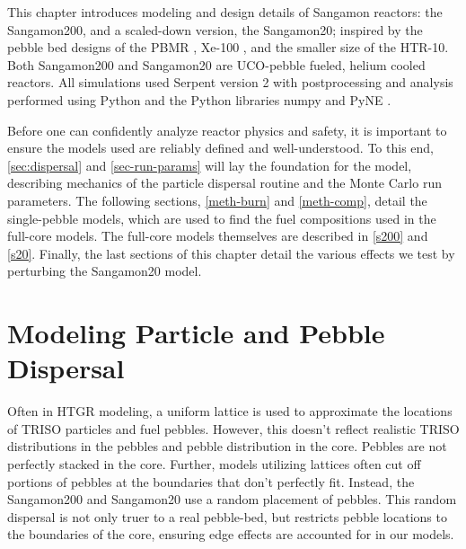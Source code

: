 This chapter introduces modeling and design details of Sangamon reactors:  the Sangamon200, and a scaled-down version, the Sangamon20; inspired by the pebble bed designs of the PBMR \cite{venter_pbmr_2005}, Xe-100 \cite{harlan_ans_2017, harlan_x-energy_2018}, and the smaller size of the HTR-10.  Both Sangamon200 and Sangamon20 are UCO-pebble fueled, helium cooled reactors.  All simulations used Serpent version 2 \cite{leppanenjaakko_serpent_2015} with postprocessing and analysis performed using Python \cite{van_rossum_python_2009} and the Python libraries numpy \cite{harris_array_2020} and PyNE \cite{scopatz_pyne:_2012}.

Before one can confidently analyze reactor physics and safety, it is important to ensure the models used are reliably defined and well-understood.  To this end, \autoref{sec:dispersal} and \autoref{sec-run-params} will lay the foundation for the model, describing mechanics of the particle dispersal routine and the Monte Carlo run parameters.  The following sections, \autoref{meth-burn} and \autoref{meth-comp}, detail the single-pebble models, which are used to find the fuel compositions used in the full-core models.  The full-core models themselves are described in \autoref{s200} and \autoref{s20}.  Finally, the last sections of this chapter detail the various effects we test by perturbing the Sangamon20 model.

\section{Modeling Particle and Pebble Dispersal}
\label{sec:dispersal}

Often in HTGR modeling, a uniform lattice is used to approximate the locations of TRISO particles and fuel pebbles.  However, this doesn't reflect realistic TRISO distributions in the pebbles and pebble distribution in the core.  Pebbles are not perfectly stacked in the core.  Further, models utilizing lattices often cut off portions of pebbles at the boundaries that don't perfectly fit.  Instead, the Sangamon200 and Sangamon20 use a random placement of pebbles.  This random dispersal is not only truer to a real pebble-bed, but restricts pebble locations to the boundaries of the core, ensuring edge effects are accounted for in our models.

